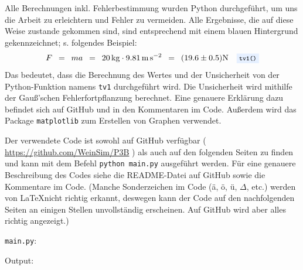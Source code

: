 \documentclass{article}
\newcommand{\widespace}{\enspace}
\newcommand{\wideeq}{\widespace = \widespace}
\newcommand{\coderef}[1]{%
    \text{\footnotesize \colorbox{codebg}{\texttt{#1()}}}%
}
\newcommand{\githuburl}{
    \url{https://github.com/WeinSim/P3B}
}
\begin{document}
Alle Berechnungen inkl. Fehlerbestimmung wurden Python durchgeführt, um uns die Arbeit
zu erleichtern und Fehler zu vermeiden.
Alle Ergebnisse, die auf diese Weise zustande gekommen sind,
sind entsprechend mit einem \colorbox{codebg}{blauen Hintergrund} gekennzeichnet;
s. folgendes Beispiel:
\[
    F \wideeq ma \wideeq \qty{20}{\kg} \cdot \qty{9.81}{\meter\per\square\second}
    \wideeq (\num{19.6} \pm \num{0,5}) \unit{\N} \quad \coderef{tv1}
\]
Das bedeutet, dass die Berechnung des Wertes und der Unsicherheit von der
Python-Funktion namens \verb|tv1| durchgeführt wird.
Die Unsicherheit wird mithilfe der Gauß'schen Fehlerfortpflanzung berechnet.
Eine genauere Erklärung dazu befindet sich auf GitHub und in den Kommentaren im Code.
Außerdem wird das Package \texttt{matplotlib} zum Erstellen
von Graphen verwendet.

Der verwendete Code ist sowohl auf GitHub verfügbar (\githuburl) als auch auf den
folgenden Seiten zu finden und kann mit dem Befehl \texttt{python main.py}
ausgeführt werden. Für eine genauere Beschreibung des Codes siehe die README-Datei
auf GitHub sowie die Kommentare im Code.
(Manche Sonderzeichen im Code (ä, ö, ü, $\Delta$, etc.) werden von \LaTeX nicht
richtig erkannt, deswegen kann der Code auf den nachfolgenden Seiten an einigen
Stellen unvollständig erscheinen. Auf GitHub wird aber alles richtig angezeigt.)

\newpage


\verb|main.py|:

\newpage

% 

Output:

\end{document}
